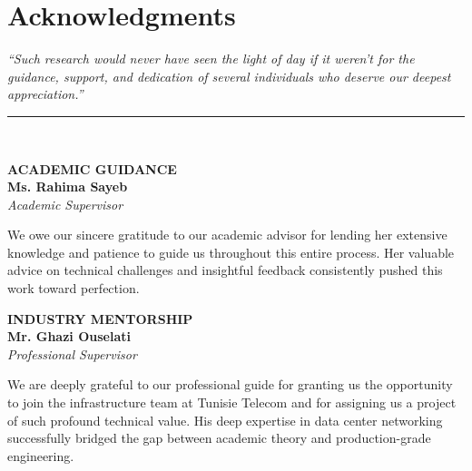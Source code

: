 \chapter*{Acknowledgments}

\begin{center}
    \vspace{-1.5em}
    \begin{minipage}{0.85\textwidth}
        \small\itshape\centering
        ``Such research would never have seen the light of day if it weren't for the guidance, support, and dedication of several individuals who deserve our deepest appreciation.''
    \end{minipage}
    \vspace{-1em}
    \rule{6cm}{2.5pt} \\
    \vspace{2.5em}
\end{center}

\noindent
\begin{minipage}[t]{0.28\textwidth}
    \raggedright
    \textbf{\uppercase{Academic Guidance}}
    \vspace{0.3em} \\
    \small\textbf{Ms. Rahima Sayeb} \\
    \textit{Academic Supervisor}
\end{minipage}
\hfill
\begin{minipage}[t]{0.68\textwidth}
    \small We owe our sincere gratitude to our academic advisor for lending her extensive knowledge and patience to guide us throughout this entire process. Her valuable advice on technical challenges and insightful feedback consistently pushed this work toward perfection.
\end{minipage}

\vspace{2.5em}

\noindent
\begin{minipage}[t]{0.28\textwidth}
    \raggedright
    \textbf{\uppercase{Industry Mentorship}}
    \vspace{0.3em} \\
    \small\textbf{Mr. Ghazi Ouselati} \\
    \textit{Professional Supervisor}
\end{minipage}
\hfill
\begin{minipage}[t]{0.68\textwidth}
    \small We are deeply grateful to our professional guide for granting us the opportunity to join the infrastructure team at Tunisie Telecom and for assigning us a project of such profound technical value. His deep expertise in data center networking successfully bridged the gap between academic theory and production-grade engineering.
\end{minipage}

